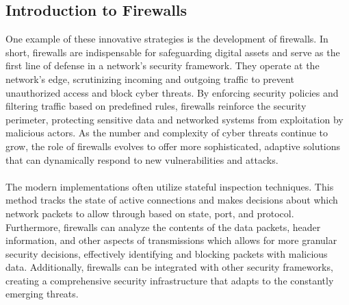 \subsection{Introduction to Firewalls}
One example of these innovative strategies is the development of firewalls. In short, firewalls are indispensable for safeguarding digital assets and serve as the first line of defense in a network's security framework. They operate at the network's edge, scrutinizing incoming and outgoing traffic to prevent unauthorized access and block cyber threats. By enforcing security policies and filtering traffic based on predefined rules, firewalls reinforce the security perimeter, protecting sensitive data and networked systems from exploitation by malicious actors. As the number and complexity of cyber threats continue to grow, the role of firewalls evolves to offer more sophisticated, adaptive solutions that can dynamically respond to new vulnerabilities and attacks.\\
\\
The modern implementations often utilize stateful inspection techniques. This method tracks the state of active connections and makes decisions about which network packets to allow through based on state, port, and protocol. Furthermore, firewalls can analyze the contents of the data packets, header information, and other aspects of transmissions which allows for more granular security decisions, effectively identifying and blocking packets with malicious data. Additionally, firewalls can be integrated with other security frameworks, creating a comprehensive security infrastructure that adapts to the constantly emerging threats.
